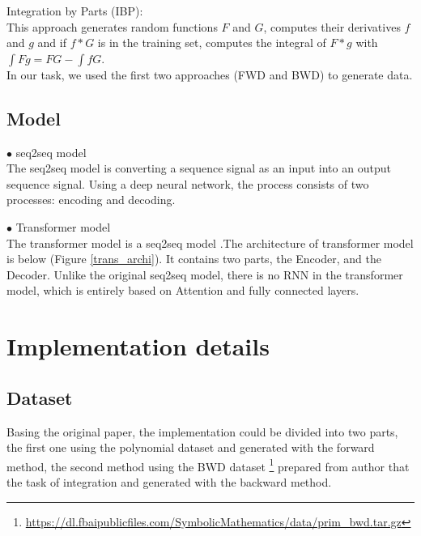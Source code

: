 \documentclass{article} %
\begin{document}
Integration by Parts (IBP):\\
This approach generates random functions $F$ and $G$, computes their derivatives $f$ and $g$ and if $f*G$ is in the training set, computes the integral of $F*g$ with $\int F g=F G-\int f G$.\\
In our task, we used the first two approaches (FWD and BWD) to generate data.

\subsection{Model}
$\bullet$ \quad seq2seq model\\
The seq2seq model is converting a sequence signal as an input into an output sequence signal. Using a deep neural network, the process consists of two processes: encoding and decoding.

$\bullet$ \quad Transformer model\\
The transformer model is a seq2seq model \cite{vaswani2017attention}.The architecture of transformer model is below (Figure \ref{trans_archi}). It contains two parts, the Encoder, and the Decoder. Unlike the original seq2seq model, there is no RNN in the transformer model, which is entirely based on Attention and fully connected layers.

\section{Implementation details}
\label{Implement}
\subsection{Dataset}
Basing the original paper, the implementation could be divided into two parts, the first one using the polynomial dataset and generated with the forward method, the second method using the BWD dataset \footnote{\url{https://dl.fbaipublicfiles.com/SymbolicMathematics/data/prim_bwd.tar.gz}} prepared from author that the task of integration and generated with the backward method.
\end{document}
